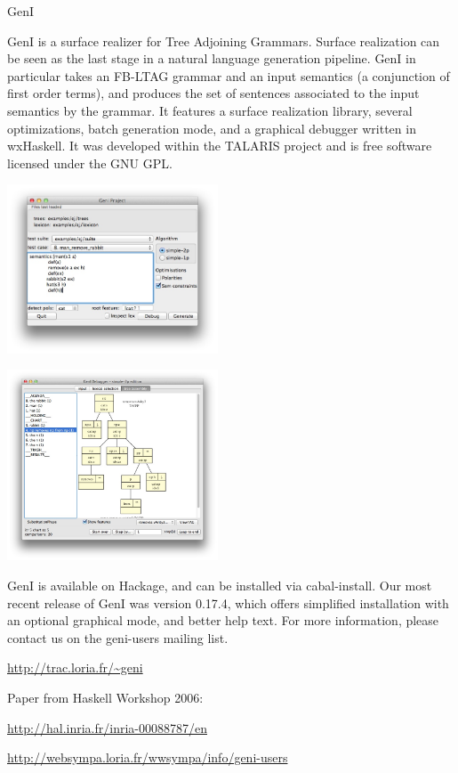 \begin{hcarentry}[updated]{GenI}
\label{geni}
\makeheader

GenI is a surface realizer for Tree Adjoining Grammars. Surface
realization can be seen as the last stage in a natural language
generation pipeline. GenI in particular takes an FB-LTAG grammar and an
input semantics (a conjunction of first order terms), and produces the
set of sentences associated to the input semantics by the grammar.  It
features a surface realization library, several optimizations, batch
generation mode, and a graphical debugger written in wxHaskell.  It was
developed within the TALARIS project and is free software licensed under
the GNU GPL.

\begin{center}
\includegraphics[width=0.47\textwidth]{html/GenI-main-screenshot.jpg}
\end{center}

\begin{center}
\includegraphics[width=0.47\textwidth]{html/GenI-debugger-screenshot.jpg}
\end{center}

GenI is available on Hackage, and can be installed via cabal-install.
Our most recent release of GenI was version 0.17.4, which offers
simplified installation with an optional graphical mode, and better help
text. For more information, please contact us on the geni-users mailing
list.

\FurtherReading
\begin{compactitem}
\item \url{http://trac.loria.fr/~geni}
\item Paper from Haskell Workshop 2006:

\url{http://hal.inria.fr/inria-00088787/en}
\item \url{http://websympa.loria.fr/wwsympa/info/geni-users}
\end{compactitem}
\end{hcarentry}
